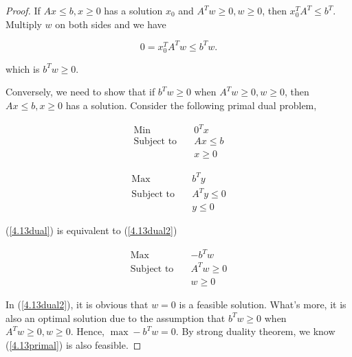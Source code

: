 \documentclass[12pt]{article}
\begin{document}
\begin{proof}

If $Ax \leqslant b, x\geqslant 0$ has a solution $x_0$ and $A^Tw \geqslant 0, w\geqslant 0$, then $x_0^TA^T\leqslant b^T$. Multiply $w$ on both sides and we have 

$$
0 = x_0^TA^Tw \leqslant b^Tw.
$$

which is $b^Tw \geqslant 0$.


Conversely, we need to show that if $b^Tw\geqslant 0$ when $A^Tw \geqslant 0, w\geqslant 0$, then $Ax \leqslant b, x\geqslant 0$ has a solution. Consider the following primal dual problem,

\begin{equation}\label{4.13primal}
\begin{aligned}
\text{Min} \quad  & 0^Tx \\
\text{Subject to} \quad & Ax \leqslant b \\
& x\geqslant 0
\end{aligned}
\end{equation}

\begin{equation}\label{4.13dual}
\begin{aligned}
\text{Max} \quad  & b^Ty \\
\text{Subject to} \quad & A^Ty \leqslant 0 \\
& y\leqslant 0
\end{aligned}
\end{equation}

(\ref{4.13dual}) is equivalent to (\ref{4.13dual2})

\begin{equation}\label{4.13dual2}
\begin{aligned}
\text{Max} \quad  & -b^Tw \\
\text{Subject to} \quad & A^Tw \geqslant 0 \\
& w\geqslant 0
\end{aligned}
\end{equation}

In (\ref{4.13dual2}), it is obvious that $w=0$ is a feasible solution. What's more, it is also an optimal solution due to the assumption that $b^Tw \geqslant 0$ when $A^Tw \geqslant 0, w\geqslant 0$. Hence, $\max -b^Tw = 0$. By strong duality theorem, we know (\ref{4.13primal}) is also feasible.


\end{proof}
\end{document}
